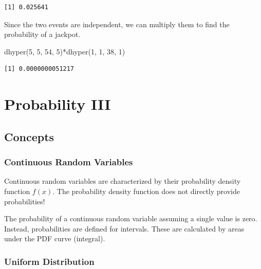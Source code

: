\documentclass[
  letterpaper,
  DIV=11,
  numbers=noendperiod]{scrreprt}
\newenvironment{Shaded}{\begin{snugshade}}{\end{snugshade}}
\newcommand{\DecValTok}[1]{\textcolor[rgb]{0.68,0.00,0.00}{#1}}
\newcommand{\FunctionTok}[1]{\textcolor[rgb]{0.28,0.35,0.67}{#1}}
\newcommand{\NormalTok}[1]{\textcolor[rgb]{0.00,0.23,0.31}{#1}}
\newcommand{\SpecialCharTok}[1]{\textcolor[rgb]{0.37,0.37,0.37}{#1}}
\begin{document}
\begin{verbatim}
[1] 0.025641
\end{verbatim}

Since the two events are independent, we can multiply them to find the
probability of a jackpot.

\begin{Shaded}
\begin{Highlighting}[numbers=left,,]
\FunctionTok{dhyper}\NormalTok{(}\DecValTok{5}\NormalTok{, }\DecValTok{5}\NormalTok{, }\DecValTok{54}\NormalTok{, }\DecValTok{5}\NormalTok{)}\SpecialCharTok{*}\FunctionTok{dhyper}\NormalTok{(}\DecValTok{1}\NormalTok{, }\DecValTok{1}\NormalTok{, }\DecValTok{38}\NormalTok{, }\DecValTok{1}\NormalTok{)}
\end{Highlighting}
\end{Shaded}

\begin{verbatim}
[1] 0.0000000051217
\end{verbatim}

\hypertarget{probability-iii}{%
\chapter{Probability III}\label{probability-iii}}

\hypertarget{concepts-9}{%
\section{Concepts}\label{concepts-9}}

\hypertarget{continuous-random-variables}{%
\subsection*{Continuous Random
Variables}\label{continuous-random-variables}}

Continuous random variables are characterized by their probability
density function \(f(x)\). The probability density function does not
directly provide probabilities!

The probability of a continuous random variable assuming a single value
is zero. Instead, probabilities are defined for intervals. These are
calculated by areas under the PDF curve (integral).

\hypertarget{uniform-distribution}{%
\subsection*{Uniform Distribution}\label{uniform-distribution}}
\end{document}
